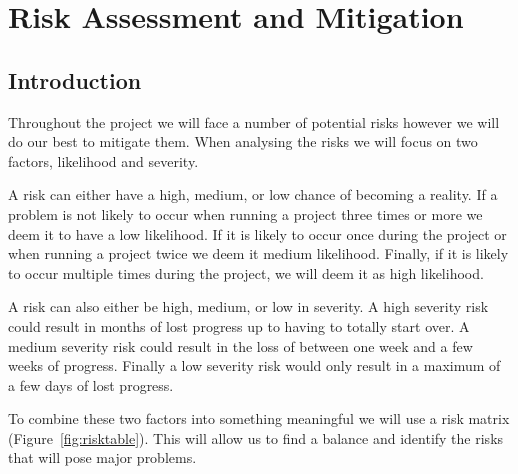 \chapter{Risk Assessment and Mitigation}
\section{Introduction}
Throughout the project we will face a number of potential risks however we will do our best to mitigate them.
When analysing the risks we will focus on two factors, likelihood and severity.

A risk can either have a high, medium, or low chance of becoming a reality.
If a problem is not likely to occur when running a project three times or more we deem it to have a low likelihood.
If it is likely to occur once during the project or when running a project twice we deem it medium likelihood.
Finally, if it is likely to occur multiple times during the project, we will deem it as high likelihood.

A risk can also either be high, medium, or low in severity.
A high severity risk could result in months of lost progress up to having to totally start over.
A medium severity risk could result in the loss of between one week and a few weeks of progress.
Finally a low severity risk would only result in a maximum of a few days of lost progress.

To combine these two factors into something meaningful we will use a risk matrix (Figure~\ref{fig:risktable}).
This will allow us to find a balance and identify the risks that will pose major problems.

